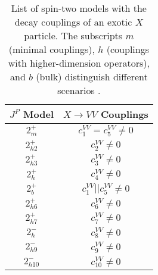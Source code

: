 \begin{table*}[htbp]
\caption[List of spin-two models with the decay couplings of an exotic $X$ particle. The subscripts $m$ (minimal couplings), $h$ (couplings with higher-dimension operators),
and $b$ (bulk) distinguish different scenarios.]{ List of spin-two models with the decay couplings of an exotic $X$ particle. The subscripts $m$ (minimal couplings), $h$ (couplings with higher-dimension operators), and $b$ (bulk) distinguish different scenarios \cite{Khachatryan:2014kca}. }
\centering
\begin{tabular}{cc}
$J^P$ Model  & $X\to VV$ Couplings \\

\hline

$2_m^+$  &   $c_{ 1}^{VV}=c_{ 5}^{VV}\ne0$     \\

$2_{h2}^+$      &   $c_{ 2}^{VV}\ne0$  \\

$2_{h3}^+$     &   $c_{ 3}^{VV}\ne0$  \\

$2_h^+$  &   $c_{ 4}^{VV}\ne0$  \\

$2_b^+$   &   $c_{ 1}^{VV} || c_{ 5}^{VV}\ne0$ \\

$2_{h6}^+$  &    $c_{ 6}^{VV}\ne0$  \\

$2_{h7}^+$ &   $c_{ 7}^{VV}\ne0$ \\

$2_h^-$  &     $c_{ 8}^{VV}\ne0$  \\

$2_{h9}^-$ &   $c_{ 9}^{VV}\ne0$ \\

$2_{h10}^-$ &  $c_{ 10}^{VV}\ne0$ \\
\end{tabular}

\label{tab:scenarios}
\end{table*}
